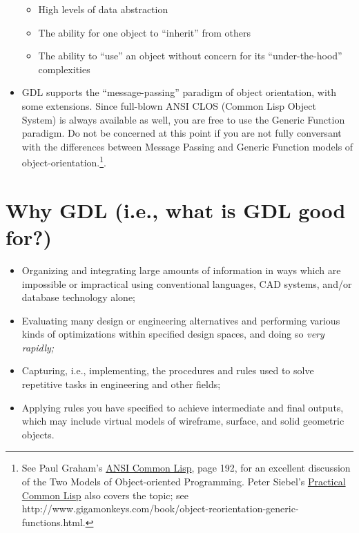 \documentclass [11pt]{book}
\begin{document}
\begin{itemize}
\begin{itemize}
\item High levels of data abstraction

\item The ability for one object to ``inherit'' from others

\item The ability to ``use'' an object without concern for
	its ``under-the-hood'' complexities

\end{itemize}


\item GDL supports the ``message-passing'' paradigm of object
orientation, with some extensions. Since full-blown ANSI CLOS (Common
Lisp Object System) is always available as well, you are free to use
the Generic Function paradigm. Do not be concerned at this point if
you are not fully conversant with the differences between Message
Passing and Generic Function models of object-orientation.\footnote{See Paul Graham's 
\underline{ANSI Common Lisp}, page 192, for an excellent discussion of the Two Models 
of Object-oriented Programming. Peter Siebel's 
\underline{Practical Common Lisp} also covers the topic; see http://www.gigamonkeys.com/book/object-reorientation-generic-functions.html.}.

\end{itemize}



\section{Why GDL (i.e., what is GDL good for?)}

\label{sec:whygdl(i.e.,whatisgdlgoodfor?)}



\begin{itemize}

\item Organizing and integrating large amounts of
information in ways which are impossible or impractical using
conventional languages, CAD systems, and/or database technology
alone;

\item Evaluating many design or engineering alternatives and 
performing various kinds of optimizations within specified design
spaces, and doing so \emph{very rapidly;}

\item Capturing, i.e., implementing, the procedures and rules used
to solve repetitive tasks in engineering and other fields;

\item Applying rules you have specified to achieve intermediate
and final outputs, which may include virtual models of wireframe,
surface, and solid geometric objects.

\end{itemize}
\end{document}
